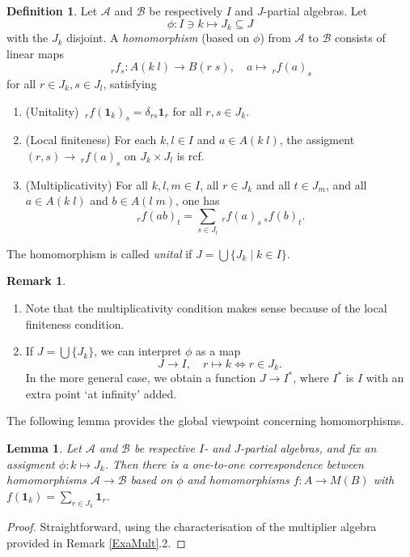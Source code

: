 \documentclass[11pt]{article}
\newcommand{\GrDA}[3]{{}_{\;#2}#1_{#3}} %
\newcommand{\Unit}{\mathbf{1}}
\newtheorem{Lem}[Theorem]{Lemma}
\theoremstyle{definition}
\newtheorem{Def}[Theorem]{Definition}
\newtheorem{Rem}[Theorem]{Remark}
\numberwithin{equation}{section}
\begin{document}
\begin{Def}\label{DefMor} Let $\mathscr{A}$ and $\mathscr{B}$ be respectively $I$ and $J$-partial algebras. Let \[\phi: I \ni k \mapsto J_k \subseteq J\] with the $J_k$ disjoint. A \emph{homomorphism} (based on $\phi$) from $\mathscr{A}$ to $\mathscr{B}$ consists of linear maps \[\GrDA{f}{r}{s}: A(k\;l)\rightarrow B(r\;s),\quad a\mapsto \GrDA{f(a)}{r}{s}\] for all $r\in J_k, s\in J_l$, satisfying 
\begin{enumerate}[label = (\arabic*)]
\item (Unitality) $\GrDA{f(\Unit_{k})}{r}{s} = \delta_{rs}\Unit_r$ for all $r,s\in J_k$.
\item (Local finiteness) For each $k,l\in I$ and $a\in A(k\;l)$, the assigment $(r,s)\rightarrow \GrDA{f(a)}{r}{s}$ on $J_k\times J_l$ is rcf. 
\item (Multiplicativity) For all $k,l,m\in I$, all $r\in J_k$ and all $t\in J_m$, and all $a\in A(k\;l)$ and $b\in A(l\;m)$, one has \[\GrDA{f(ab)}{r}{t} = \sum_{s\in J_l} \GrDA{f(a)}{r}{s}\GrDA{f(b)}{s}{t}.\]
\end{enumerate} 
The homomorphism is called \emph{unital} if $J=\bigcup \{J_k\mid k\in I\}$. %
\end{Def}
\begin{Rem}
\begin{enumerate}
\item
Note that the multiplicativity condition makes sense because of the local finiteness condition.
\item
If $J = \bigcup\{J_k\}$, we can interpret $\phi$ as a map \[J\rightarrow I,\quad r\mapsto k \iff r\in J_k.\] In the more general case, we obtain a function $J\rightarrow I^*$, where $I^*$ is $I$ with an extra point `at infinity' added.
\end{enumerate}
\end{Rem}

The following lemma provides the global viewpoint concerning homomorphisms. 

\begin{Lem} Let $\mathscr{A}$ and $\mathscr{B}$ be respective $I$- and $J$-partial algebras, and fix an assigment $\phi: k\mapsto J_k$. Then there is a one-to-one correspondence between homomorphisms $\mathscr{A}\rightarrow \mathscr{B}$ based on $\phi$ and homomorphisms $f:A\rightarrow M(B)$ with $f(\Unit_k) = \sum_{r\in J_k} \Unit_r$. 
\end{Lem} 
\begin{proof}
Straightforward, using the characterisation of the multiplier algebra provided in Remark \ref{ExaMult}.2.
\end{proof}
\end{document}
